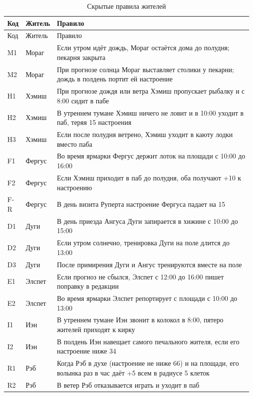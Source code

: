 \documentclass[12pt]{article}
\begin{document}
{\small\singlespacing
\begin{longtable}{|p{12mm}|p{24mm}|p{118mm}|}
\caption{Скрытые правила жителей}\label{tab:rules}\\\hline
Код & Житель & Правило\\\hline\endfirsthead
\hline Код & Житель & Правило\\\hline\endhead
M1 & Мораг & Если утром идёт дождь, Мораг остаётся дома до полудня; пекарня закрыта\\\hline
M2 & Мораг & При прогнозе солнца Мораг выставляет столики у пекарни; дождь в полдень портит ей настроение\\\hline
H1 & Хэмиш & При прогнозе дождя или ветра Хэмиш пропускает рыбалку и с 8:00 сидит в пабе\\\hline
H2 & Хэмиш & В утреннем тумане Хэмиш ничего не ловит и в 10:00 уходит в паб, теряя 15 настроения\\\hline
H3 & Хэмиш & Если после полудня ветрено, Хэмиш уходит в каюту лодки вместо паба\\\hline
F1 & Фергус & Во время ярмарки Фергус держит лоток на площади с 10:00 до 16:00\\\hline
F2 & Фергус & Если Хэмиш приходит в паб до полудня, оба получают +10 к настроению\\\hline
F-R & Фергус & В день визита Руперта настроение Фергуса падает на 15\\\hline
D1 & Дуги & В день приезда Ангуса Дуги запирается в хижине с 10:00 до 15:00\\\hline
D2 & Дуги & Если утром солнечно, тренировка Дуги на поле длится до 13:00\\\hline
D3 & Дуги & После примирения Дуги и Ангус тренируются вместе на поле\\\hline
E1 & Элспет & Если прогноз не сбылся, Элспет с 12:00 до 16:00 пишет поправку в редакции\\\hline
E2 & Элспет & Во время ярмарки Элспет репортирует с площади с 10:00 до 13:00\\\hline
I1 & Иэн & В утреннем тумане Иэн звонит в колокол в 8:00, пятеро жителей приходят к кирку\\\hline
I2 & Иэн & В полдень Иэн навещает самого печального жителя, если его настроение ниже 34\\\hline
R1 & Рэб & Когда Рэб в духе (настроение не ниже 66) и на площади, его волынка раз в час даёт +5 всем в радиусе 5 клеток\\\hline
R2 & Рэб & В ветер Рэб отказывается играть и уходит в паб\\\hline

\end{longtable}}
\end{document}
